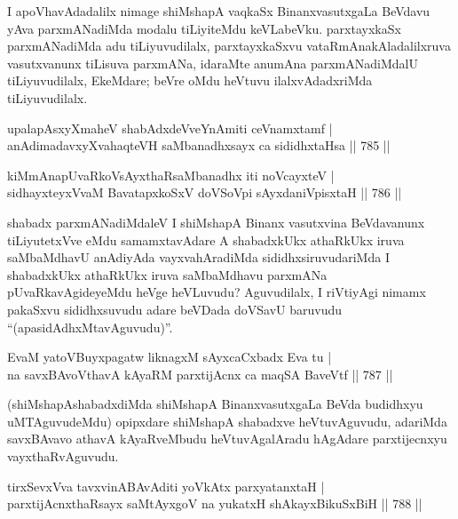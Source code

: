 \begin{artha}
I apoVhavAdadalilx nimage shiMshapA vaqkaSx BinanxvasutxgaLa BeVdavu yAva parxmANadiMda modalu tiLiyiteMdu keVLabeVku. parxtayxkaSx parxmANadiMda adu tiLiyuvudilalx, parxtayxkaSxvu vataRmAnakAladalilxruva vasutxvanunx tiLisuva parxmANa, idaraMte anumAna parxmANadiMdalU tiLiyuvudilalx, EkeMdare; beVre oMdu heVtuvu ilalxvAdadxriMda tiLiyuvudilalx.
\end{artha}


\begin{shl}
upalapAsxyXmaheV shabAdxdeVveYnAmiti ceVnamxtamf | \\
anAdimadavxyXvahaqteVH saMbanadhxsayx ca sididhxtaHsa \hfill||  785 ||  
\end{shl}
				
\begin{shl}
kiMmAnapUvaRkoV\s sAyxthaRsaMbanadhx iti noVcayxteV | \\
sidhayxteyxVvaM BavatapxkoSxV doVSoV\s pi sAyxdaniVpisxtaH \hfill||  786 ||  
\end{shl}

\begin{artha}
shabadx parxmANadiMdaleV I shiMshapA Binanx vasutxvina BeVdavanunx tiLiyutetxVve eMdu samamxtavAdare A shabadxkUkx athaRkUkx iruva saMbaMdhavU anAdiyAda vayxvahAradiMda sididhxsiruvudariMda I shabadxkUkx athaRkUkx iruva saMbaMdhavu parxmANa pUvaRkavAgideyeMdu heVge heVLuvudu? Aguvudilalx, I riVtiyAgi nimamx pakaSxvu sididhxsuvudu adare beVDada doVSavU baruvudu ``(apasidAdhxMtavAguvudu)''.
\end{artha}


\begin{shl}
EvaM yatoV\s Buyxpagatw liknagxM sAyxcaCxbadx Eva tu | \\
na savxBAvoV\s thavA kAyaRM parxtijAcnx ca maqSA BaveVtf \hfill||  787 ||  
\end{shl}

\begin{artha}
(shiMshapAshabadxdiMda shiMshapA BinanxvasutxgaLa BeVda budidhxyu uMTAguvudeMdu) opipxdare shiMshapA shabadxve heVtuvAguvudu, adariMda savxBAvavo athavA kAyaRveMbudu heVtuvAgalAradu hAgAdare parxtijecnxyu vayxthaRvAguvudu.
\end{artha}

\begin{shl}
tirxSevxVva tavxvinABAvAditi yoVkAtx parxyatanxtaH | \\
parxtijAcnxthaRsayx saMtAyxgoV na yukatxH shAkayxBikuSxBiH \hfill||  788 ||  
\end{shl}

